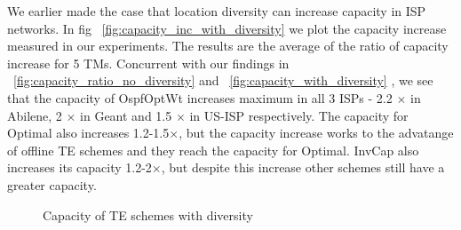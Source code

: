 We earlier made the case that location diversity can increase capacity in ISP networks. In fig ~\ref{fig:capacity_inc_with_diversity} we plot the capacity increase measured in our experiments. The results are the average of the ratio of capacity increase for 5 TMs.
Concurrent with our findings in ~\ref{fig:capacity_ratio_no_diversity} and ~\ref{fig:capacity_with_diversity} , we see that the capacity of OspfOptWt increases maximum in all 3 ISPs - 2.2 $\times$ in Abilene, 2 $\times$ in Geant and 1.5 $\times$ in US-ISP respectively. The capacity for Optimal also increases 1.2-1.5$\times$, but the capacity increase works to the advatange of offline TE schemes and they reach the capacity for Optimal. InvCap also increases its capacity 1.2-2$\times$, but despite this increase other schemes still have a greater capacity.

\begin{figure*}[tbh]
  \begin{center}
  \end{center}
  \caption{Capacity of TE schemes with diversity}
  \label{fig:all_isps_capacity_with_diversity}
\end{figure*}
